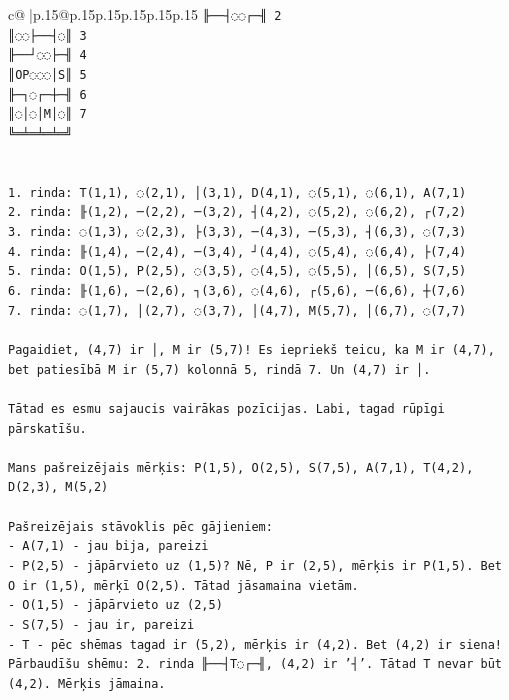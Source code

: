 \documentclass{article}
\begin{document}
{\begin{supertabular}{c@{$\;$}|p{.15\linewidth}@{}p{.15\linewidth}p{.15\linewidth}p{.15\linewidth}p{.15\linewidth}p{.15\linewidth}}
{{{\texttt{╟──┤◌◌┌─╢ 2} \\
\texttt{║◌◌├──┤◌║ 3} \\
\texttt{╟──┘◌◌├─╢ 4} \\
\texttt{║OP◌◌◌│S║ 5} \\
\texttt{╟─┐◌┌─┼─╢ 6} \\
\texttt{║◌│◌│M│◌║ 7} \\
\texttt{╚═╧═╧═╧═╝} \\
\\ 
\\ 
\texttt{1. rinda: T(1,1), ◌(2,1), │(3,1), D(4,1), ◌(5,1), ◌(6,1), A(7,1)} \\
\texttt{2. rinda: ╟(1,2), ─(2,2), ─(3,2), ┤(4,2), ◌(5,2), ◌(6,2), ┌(7,2)} \\
\texttt{3. rinda: ◌(1,3), ◌(2,3), ├(3,3), ─(4,3), ─(5,3), ┤(6,3), ◌(7,3)} \\
\texttt{4. rinda: ╟(1,4), ─(2,4), ─(3,4), ┘(4,4), ◌(5,4), ◌(6,4), ├(7,4)} \\
\texttt{5. rinda: O(1,5), P(2,5), ◌(3,5), ◌(4,5), ◌(5,5), │(6,5), S(7,5)} \\
\texttt{6. rinda: ╟(1,6), ─(2,6), ┐(3,6), ◌(4,6), ┌(5,6), ─(6,6), ┼(7,6)} \\
\texttt{7. rinda: ◌(1,7), │(2,7), ◌(3,7), │(4,7), M(5,7), │(6,7), ◌(7,7)} \\
\\ 
\texttt{Pagaidiet, (4,7) ir │, M ir (5,7)! Es iepriekš teicu, ka M ir (4,7), bet patiesībā M ir (5,7) kolonnā 5, rindā 7. Un (4,7) ir │.} \\
\\ 
\texttt{Tātad es esmu sajaucis vairākas pozīcijas. Labi, tagad rūpīgi pārskatīšu.} \\
\\ 
\texttt{Mans pašreizējais mērķis: P(1,5), O(2,5), S(7,5), A(7,1), T(4,2), D(2,3), M(5,2)} \\
\\ 
\texttt{Pašreizējais stāvoklis pēc gājieniem:} \\
\texttt{{-} A(7,1) {-} jau bija, pareizi} \\
\texttt{{-} P(2,5) {-} jāpārvieto uz (1,5)? Nē, P ir (2,5), mērķis ir P(1,5). Bet O ir (1,5), mērķī O(2,5). Tātad jāsamaina vietām.} \\
\texttt{{-} O(1,5) {-} jāpārvieto uz (2,5)} \\
\texttt{{-} S(7,5) {-} jau ir, pareizi} \\
\texttt{{-} T {-} pēc shēmas tagad ir (5,2), mērķis ir (4,2). Bet (4,2) ir siena! Pārbaudīšu shēmu: 2. rinda ╟──┤T◌┌─╢, (4,2) ir '┤'. Tātad T nevar būt (4,2). Mērķis jāmaina.} \\
}}}
\end{supertabular}}
\end{document}
